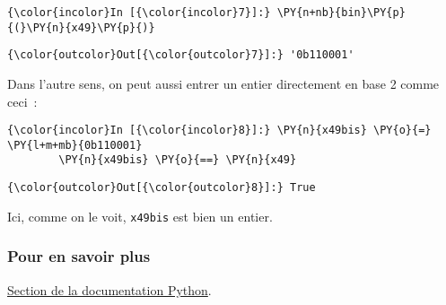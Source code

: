     \begin{Verbatim}[commandchars=\\\{\},frame=single,framerule=0.3mm,rulecolor=\color{cellframecolor}]
{\color{incolor}In [{\color{incolor}7}]:} \PY{n+nb}{bin}\PY{p}{(}\PY{n}{x49}\PY{p}{)}
\end{Verbatim}


\begin{Verbatim}[commandchars=\\\{\},frame=single,framerule=0.3mm,rulecolor=\color{cellframecolor}]
{\color{outcolor}Out[{\color{outcolor}7}]:} '0b110001'
\end{Verbatim}
            
    Dans l'autre sens, on peut aussi entrer un entier directement en base 2
comme ceci~:

    \begin{Verbatim}[commandchars=\\\{\},frame=single,framerule=0.3mm,rulecolor=\color{cellframecolor}]
{\color{incolor}In [{\color{incolor}8}]:} \PY{n}{x49bis} \PY{o}{=} \PY{l+m+mb}{0b110001}
        \PY{n}{x49bis} \PY{o}{==} \PY{n}{x49}
\end{Verbatim}


\begin{Verbatim}[commandchars=\\\{\},frame=single,framerule=0.3mm,rulecolor=\color{cellframecolor}]
{\color{outcolor}Out[{\color{outcolor}8}]:} True
\end{Verbatim}
            
    Ici, comme on le voit, \texttt{x49bis} est bien un entier.

    \hypertarget{pour-en-savoir-plus}{%
\subsubsection{Pour en savoir plus}\label{pour-en-savoir-plus}}

    \href{https://docs.python.org/3/library/stdtypes.html\#bitwise-operations-on-integer-types}{Section
de la documentation Python}.


    
    
    
